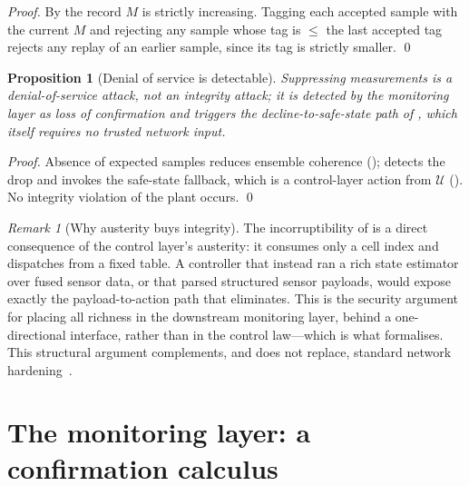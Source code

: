 \documentclass[11pt,a4paper,twocolumn]{article}
\theoremstyle{thmstyle}
\newtheorem{proposition}[theorem]{Proposition}
\theoremstyle{definition}
\theoremstyle{remark}
\newtheorem{remark}[theorem]{Remark}
\newcommand{\Us}{\mathcal{U}}
\begin{document}
\begin{proof}
By  the record $M$ is strictly increasing. Tagging
each accepted sample with the current $M$ and rejecting any sample whose
tag is $\le$ the last accepted tag rejects any replay of an earlier
sample, since its tag is strictly smaller. \qed
\end{proof}

\begin{proposition}[Denial of service is detectable]
\label{prop:dos}
Suppressing measurements is a denial-of-service attack, not an integrity
attack; it is detected by the monitoring layer as loss of confirmation
and triggers the decline-to-safe-state path of
, which itself requires no trusted
network input.
\end{proposition}

\begin{proof}
Absence of expected samples reduces ensemble coherence
();  detects the drop and invokes
the safe-state fallback, which is a control-layer action from $\Us$
(). No integrity violation of the plant occurs. \qed
\end{proof}

\begin{remark}[Why austerity buys integrity]
\label{rem:austerity}
The incorruptibility of  is a direct consequence of the
control layer's austerity: it consumes only a cell index and dispatches
from a fixed table. A controller that instead ran a rich state estimator
over fused sensor data, or that parsed structured sensor payloads, would
expose exactly the payload-to-action path that 
eliminates. This is the security argument for placing all richness in the
downstream monitoring layer, behind a one-directional interface, rather
than in the control law---which is what  formalises.
This structural argument complements, and does not replace, standard
network hardening~\citep{teixeira2015secure}.
\end{remark}

\section{The monitoring layer: a confirmation calculus}
\label{sec:monitoring}
\end{document}
